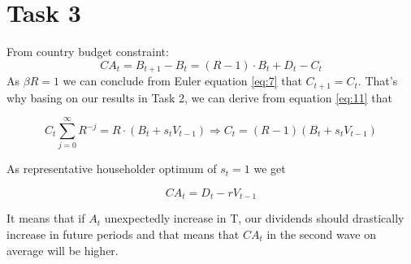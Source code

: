 \documentclass{article}
\begin{document}
\section*{Task 3}

From country budget constraint:
\begin{equation*}
	CA_t = B_{t+1} - B_t = (R-1) \cdot B _ { t } + D _ { t } - C _ { t } 
\end{equation*}
As $ \beta R = 1 $ we can conclude from Euler equation \ref{eq:7} that $ C_{t+1} = C_t $. That's why basing on our results in Task 2, we can derive from equation \ref{eq:11} that

\begin{equation}
	C_t \sum _ { j = 0 } ^ { \infty } R ^ { - j } =  R \cdot \left( B_t + s_t V_{t-1}\right) \Rightarrow C_t = (R-1)(B_t +s_tV_{t-1})
\end{equation}

As representative householder optimum of $ s_t = 1 $ we get

\begin{equation}
	CA_t  = D_t - rV_{t-1}
\end{equation}

It means that if $ A_t $ unexpectedly increase in T, our dividends should drastically increase in future periods and that means that $ CA_{t} $ in the second wave on average will be higher.
\end{document}
